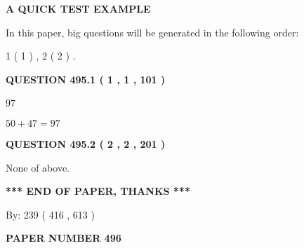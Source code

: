 \documentclass[12pt]{article}
\begin{document}
   
 \vspace{0.2in}
{\LARGE {\textbf{ A QUICK TEST EXAMPLE}}}
   
   
   
\vspace{0.2in}
   
In this paper, big questions will be generated in the following order: 
   
   
   1 ( 1 )
 ,
   2 ( 2 )
 .
  
\vspace{0.2in}
  
{\textbf{\Large{QUESTION
495.1 
 ( 1 , 1 , 101 )
}}}
  
  
 
 
\noindent{}

97
 
 
 
 
\noindent{}

$ %
50 +  %
47=   %
97$
 
 
  
\vspace{0.2in}
  
{\textbf{\Large{QUESTION
495.2 
 ( 2 , 2 , 201 )
}}}
  
  
 
 
\noindent{}
 
 
 None of above.
 
 
 
 
   
   
 \vspace{0.2in}
 
   
   
   
   
\vspace{1.0in} 
{\textbf{\large{ *** END OF PAPER, THANKS *** }}} 
   
   
\hspace{1.0in} By: 
 239 ( 416 ,  613 )
   
   
   
   
\newpage 
\setcounter{page}{ 
   496001 } 
   
   
   
   
 {\textbf{ \Large{ PAPER NUMBER  496  }}}
   
   
\vspace{0.2in}
   
\end{document}

